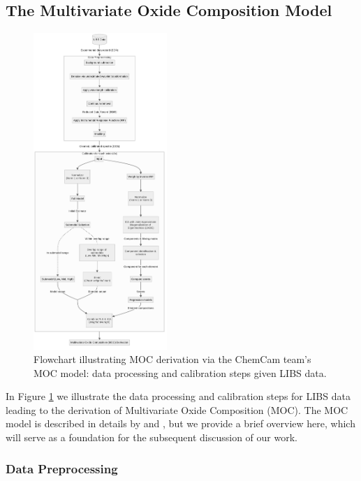 \subsection{The Multivariate Oxide Composition Model}\label{sec:moc}
\begin{figure}[ht]
    \centering
    \includegraphics[width=0.45\textwidth]{images/pipeline.png}
    \caption{Flowchart illustrating MOC derivation via the ChemCam team's MOC model: data processing and calibration steps given LIBS data.}
    \label{fig:libs_data_processing}
\end{figure}

In Figure \ref{fig:libs_data_processing} we illustrate the data processing and calibration steps for LIBS data leading to the derivation of Multivariate Oxide Composition (MOC). The MOC model is described in details by \citet{cleggRecalibrationMarsScience2017} and \citet{andersonImprovedAccuracyQuantitative2017}, but we provide a brief overview here, which will serve as a foundation for the subsequent discussion of our work.

\subsubsection{Data Preprocessing}\label{sec:data_preprocessing}

